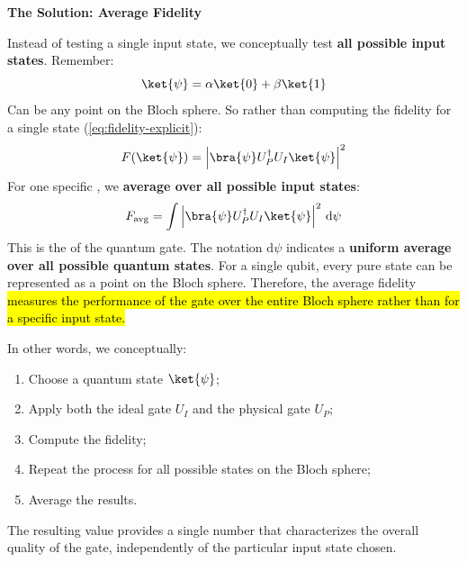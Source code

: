 \highspace
\begin{flushleft}
    \textcolor{Green3}{ \textbf{The Solution: Average Fidelity}}
\end{flushleft}
Instead of testing a single input state, we conceptually test \textbf{all possible input states}. Remember:
\begin{equation*}
    \ket{\psi} = \alpha \ket{0} + \beta \ket{1}
\end{equation*}
Can be any point on the Bloch sphere. So rather than computing the fidelity for a single state (\autoref{eq:fidelity-explicit}):
\begin{equation*}
    F(\ket{\psi}) = \left| \bra{\psi} U_P^{\dagger} U_I \ket{\psi} \right|^2
\end{equation*}
For one specific \ket{\psi}, we \textbf{average over all possible input states}:
\begin{equation}
    F_{\text{avg}} = \int \left| \bra{\psi} U_P^{\dagger} U_I \ket{\psi} \right|^2 \, \mathrm{d}\psi
\end{equation}
This is the  of the quantum gate. The notation $\mathrm{d}\psi$ indicates a \textbf{uniform average over all possible quantum states}. For a single qubit, every pure state can be represented as a point on the Bloch sphere. Therefore, the average fidelity \hl{measures the performance of the gate over the entire Bloch sphere rather than for a specific input state.}

\highspace
In other words, we conceptually:
\begin{enumerate}
    \item Choose a quantum state $\ket{\psi}$;
    \item Apply both the ideal gate $U_I$ and the physical gate $U_P$;
    \item Compute the fidelity;
    \item Repeat the process for all possible states on the Bloch sphere;
    \item Average the results.
\end{enumerate}
The resulting value provides a single number that characterizes the overall quality of the gate, independently of the particular input state chosen.

